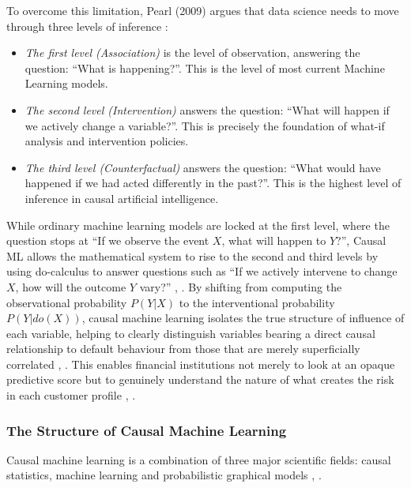 To overcome this limitation, Pearl (2009) argues that data science needs to move through three levels of inference \cite{pearl2009causality}:
\begin{itemize}
    \item \textit{The first level (Association)} is the level of observation, answering the question: ``What is happening?''. This is the level of most current Machine Learning models.
    \item \textit{The second level (Intervention)} answers the question: ``What will happen if we actively change a variable?''. This is precisely the foundation of what-if analysis and intervention policies.
    \item \textit{The third level (Counterfactual)} answers the question: ``What would have happened if we had acted differently in the past?''. This is the highest level of inference in causal artificial intelligence.
\end{itemize}

While ordinary machine learning models are locked at the first level, where the question stops at ``If we observe the event $X$, what will happen to $Y$?'', Causal ML allows the mathematical system to rise to the second and third levels by using do-calculus to answer questions such as ``If we actively intervene to change $X$, how will the outcome $Y$ vary?'' \cite{pearl2009causality}, \cite{peters2017elements}. By shifting from computing the observational probability $P(Y|X)$ to the interventional probability $P(Y|do(X))$, causal machine learning isolates the true structure of influence of each variable, helping to clearly distinguish variables bearing a direct causal relationship to default behaviour from those that are merely superficially correlated \cite{liu2024credit}, \cite{bueff2022counterfactual}. This enables financial institutions not merely to look at an opaque predictive score but to genuinely understand the nature of what creates the risk in each customer profile \cite{basel2006international}, \cite{liu2024credit}.

\subsubsection{The Structure of Causal Machine Learning}
\noindent
 Causal machine learning is a combination of three major scientific fields: causal statistics, machine learning and probabilistic graphical models \cite{pearl2009causality}, \cite{koller2009probabilistic}.
 
